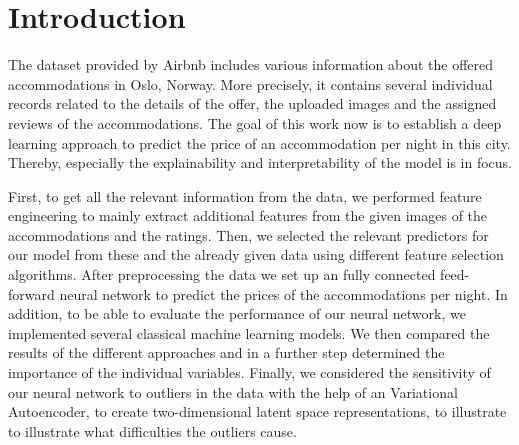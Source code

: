 \section{Introduction}



The dataset provided by Airbnb includes various information about the offered accommodations in Oslo, Norway. More precisely, it contains several individual records related to the details of the offer, the uploaded images and the assigned reviews of the accommodations.
The goal of this work now is to establish a deep learning approach to predict the price of an accommodation per night in this city. Thereby, especially the explainability and interpretability of the model is in focus. 

First, to get all the relevant information from the data, we performed feature engineering to mainly extract additional features from the given images of the accommodations and the ratings. Then, we selected the relevant predictors for our model from these and the already given data using different feature selection algorithms. After preprocessing the data we set up an fully connected feed-forward neural network to predict the prices of the accommodations per night. In addition, to be able to evaluate the performance of our neural network, we implemented several classical machine learning models. We then compared the results of the different approaches and in a further step determined the importance of the individual variables. Finally, we considered the sensitivity of our neural network to outliers in the data with the help of an Variational Autoencoder, to create two-dimensional latent space representations, to illustrate to illustrate what difficulties the outliers cause.

